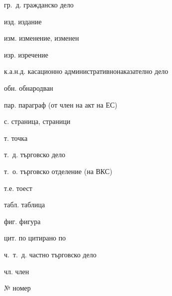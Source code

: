 {\begin{multicols}{2}
\begin{abbrlist}
\item[гр.~д.] гражданско дело
\item[изд.] издание
\item[изм.] изменение, изменен
\item[изр.] изречение
\item[к.а.н.д.] касационно административнонаказателно дело
\item[обн.] обнародван
\item[пар.] параграф (от член на акт на ЕС)
\item[с.] страница, страници
\item[т.] точка
\item[т.~д.] търговско дело
\item[т.~о.] търговско отделение (на ВКС)
\item[т.е.] тоест
\item[табл.] таблица
\item[фиг.] фигура
\item[цит. по] цитирано по
\item[ч.~т.~д.] частно търговско дело
\item[чл.] член
\item[№] номер
\end{abbrlist}
\end{multicols}
}
